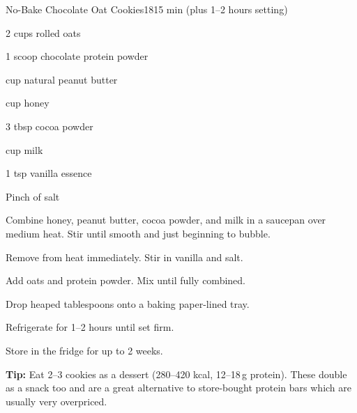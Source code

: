\begin{recipebox}{No-Bake Chocolate Oat Cookies}{18}{15 min (plus 1--2 hours setting)}
\begin{ingredients}
  \item 2 cups rolled oats
  \item 1 scoop chocolate protein powder
  \item \textonehalf{} cup natural peanut butter
  \item \textonehalf{} cup honey
  \item 3 tbsp cocoa powder
  \item \textonehalf{} cup milk
  \item 1 tsp vanilla essence
  \item Pinch of salt
\end{ingredients}

\begin{method}
  \item Combine honey, peanut butter, cocoa powder, and milk in a saucepan over medium heat. Stir until smooth and just beginning to bubble.
  \item Remove from heat immediately. Stir in vanilla and salt.
  \item Add oats and protein powder. Mix until fully combined.
  \item Drop heaped tablespoons onto a baking paper-lined tray.
  \item Refrigerate for 1--2 hours until set firm.
  \item Store in the fridge for up to 2 weeks.
\end{method}

\begin{notelist}
  \item \textbf{Tip:} Eat 2--3 cookies as a dessert (280--420 kcal, 12--18\,g protein). These double as a snack too and are a great alternative to store-bought protein bars which are usually very overpriced.
\end{notelist}
\end{recipebox}
